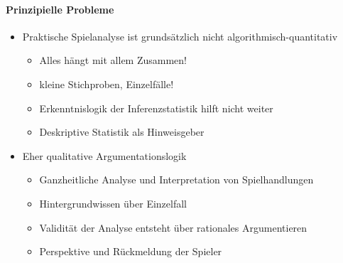 \paragraph{Prinzipielle Probleme}
\begin{itemize}
  \item Praktische Spielanalyse ist grundsätzlich nicht algorithmisch-quantitativ
    \begin{itemize}
      \item Alles hängt mit allem Zusammen!
      \item kleine Stichproben, Einzelfälle!
      \item Erkenntnislogik der Inferenzstatistik hilft nicht weiter
      \item Deskriptive Statistik als Hinweisgeber
    \end{itemize}
  \item Eher qualitative Argumentationslogik
    \begin{itemize}
      \item Ganzheitliche Analyse und Interpretation von Spielhandlungen
      \item Hintergrundwissen über Einzelfall
      \item Validität der Analyse entsteht über rationales Argumentieren
      \item Perspektive und Rückmeldung der Spieler
    \end{itemize}
\end{itemize}
